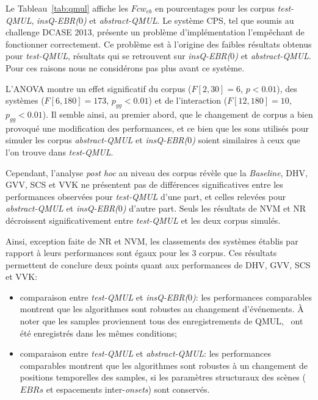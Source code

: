 
Le Tableau~\ref{tab:qmul} affiche les $Fcw_{eb}$ en pourcentages pour les corpus \emph{test-QMUL}, \emph{insQ-EBR($0$)} et \emph{abstract-QMUL}. Le système CPS, tel que soumis au challenge DCASE 2013, présente un problème d'implémentation l'empêchant de fonctionner correctement. Ce problème est à l'origine des faibles résultats obtenus pour \emph{test-QMUL}, résultats qui se retrouvent sur \emph{insQ-EBR($0$)} et \emph{abstract-QMUL}. Pour ces raisons nous ne considérons pas plus avant ce système.

L'ANOVA montre un effet significatif du corpus  ($F[2,30]=6$, $p<0.01$), des systèmes  ($F[6,180]=173$, $p_{gg}<0.01$) et de l'interaction  ($F[12,180]=10$, $p_{gg}<0.01$). Il semble ainsi, au premier abord, que le changement de corpus a bien provoqué une modification des performances, et ce bien que les sons utilisés pour simuler les corpus \emph{abstract-QMUL} et \emph{insQ-EBR($0$)} soient similaires à ceux que l'on trouve dans \emph{test-QMUL}.

Cependant, l'analyse \emph{post hoc} au niveau des corpus révèle que la \emph{Baseline}, DHV, GVV, SCS et VVK ne présentent pas de différences significatives entre les performances observées pour \emph{test-QMUL} d'une part, et celles relevées pour \emph{abstract-QMUL} et \emph{insQ-EBR($0$)} d'autre part. Seuls les résultats de NVM et NR décroissent significativement entre \emph{test-QMUL} et les deux corpus simulés.

Ainsi, exception faite de NR et NVM, les classements des systèmes établis par rapport à leurs performances sont égaux pour les 3 corpus. Ces résultats permettent de conclure deux points quant aux performances de DHV, GVV, SCS et VVK:

\begin{itemize}
\item comparaison entre \emph{test-QMUL} et \emph{insQ-EBR($0$)}: les performances comparables montrent que les algorithmes sont robustes au changement d'événements. À noter que les samples proviennent tous des enregistrements de QMUL, \ie~ont été enregistrés dans les mêmes conditions;
\item comparaison entre \emph{test-QMUL} et \emph{abstract-QMUL}: les performances comparables montrent que les algorithmes sont robustes à un changement de positions temporelles des samples, si les paramètres structuraux des scènes ($EBRs$ et espacements inter-\emph{onsets}) sont conservés.
\end{itemize}
  
